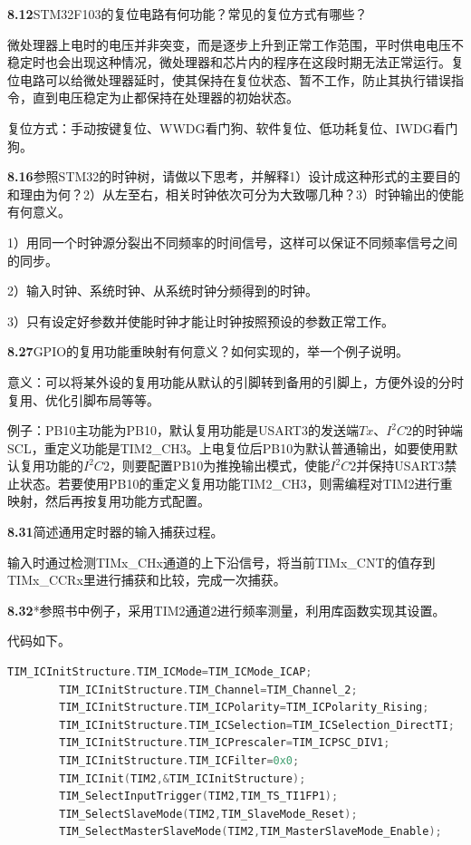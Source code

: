 \documentclass{article}
\begin{document}
    \noindent\textbf{8.12}STM32F103的复位电路有何功能？常见的复位方式有哪些？\par
    微处理器上电时的电压并非突变，而是逐步上升到正常工作范围，平时供电电压不稳定时也会出现这种情况，微处理器和芯片内的程序在这段时期无法正常运行。复位电路可以给微处理器延时，使其保持在复位状态、暂不工作，防止其执行错误指令，直到电压稳定为止都保持在处理器的初始状态。\par
    复位方式：手动按键复位、WWDG看门狗、软件复位、低功耗复位、IWDG看门狗。
    \\[4pt]\par

    \noindent\textbf{8.16}参照STM32的时钟树，请做以下思考，并解释1）设计成这种形式的主要目的和理由为何？2）从左至右，相关时钟依次可分为大致哪几种？3）时钟输出的使能有何意义。\par
    1）用同一个时钟源分裂出不同频率的时间信号，这样可以保证不同频率信号之间的同步。\par
    2）输入时钟、系统时钟、从系统时钟分频得到的时钟。\par
    3）只有设定好参数并使能时钟才能让时钟按照预设的参数正常工作。
    \\[4pt]\par

    \noindent\textbf{8.27}GPIO的复用功能重映射有何意义？如何实现的，举一个例子说明。\par
    意义：可以将某外设的复用功能从默认的引脚转到备用的引脚上，方便外设的分时复用、优化引脚布局等等。\par
    例子：PB10主功能为PB10，默认复用功能是USART3的发送端$Tx$、$I^{2}C2$的时钟端SCL，重定义功能是TIM2\_CH3。上电复位后PB10为默认普通输出，如要使用默认复用功能的$I^{2}C2$，则要配置PB10为推挽输出模式，使能$I^{2}C2$并保持USART3禁止状态。若要使用PB10的重定义复用功能TIM2\_CH3，则需编程对TIM2进行重映射，然后再按复用功能方式配置。
    \\[4pt]\par

    \noindent\textbf{8.31}简述通用定时器的输入捕获过程。\par
    输入时通过检测TIMx\_CHx通道的上下沿信号，将当前TIMx\_CNT的值存到TIMx\_CCRx里进行捕获和比较，完成一次捕获。
    \\[4pt]\par

    \noindent\textbf{8.32}*参照书中例子，采用TIM2通道2进行频率测量，利用库函数实现其设置。\par
    代码如下。

    \begin{lstlisting}[language=C]
        TIM_ICInitStructure.TIM_ICMode=TIM_ICMode_ICAP; 
        TIM_ICInitStructure.TIM_Channel=TIM_Channel_2;
        TIM_ICInitStructure.TIM_ICPolarity=TIM_ICPolarity_Rising;
        TIM_ICInitStructure.TIM_ICSelection=TIM_ICSelection_DirectTI;
        TIM_ICInitStructure.TIM_ICPrescaler=TIM_ICPSC_DIV1; 
        TIM_ICInitStructure.TIM_ICFilter=0x0;
        TIM_ICInit(TIM2,&TIM_ICInitStructure);
        TIM_SelectInputTrigger(TIM2,TIM_TS_TI1FP1);
        TIM_SelectSlaveMode(TIM2,TIM_SlaveMode_Reset); 
        TIM_SelectMasterSlaveMode(TIM2,TIM_MasterSlaveMode_Enable);
    \end{lstlisting}
\end{document}
